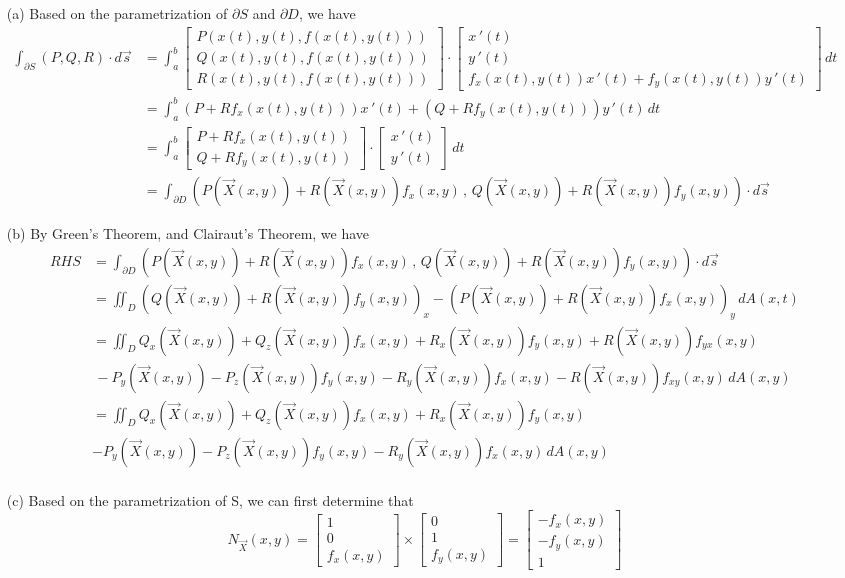 \documentclass[11pt,letterpaper,cm]{nupset}
\newcommand{\bmat}[1]{\begin{bmatrix} #1 \end{bmatrix}}
\begin{document}
\begin{solution}
		\begin{itemize}
		\item[(a)] Based on the parametrization of $\partial S$ and $\partial D$, we have
			\begin{align*}
				\int_{\partial S} (P,Q,R) \cdot d\vec{s}&=\int_a^b \bmat{P(x(t),y(t),f(x(t),y(t)))\\Q(x(t),y(t),f(x(t),y(t)))\\R(x(t),y(t),f(x(t),y(t)))}\cdot\bmat{x\, '(t)\\y\, '(t)\\f_x(x(t),y(t))x\, '(t)+f_y(x(t),y(t))y\, '(t)}\,dt\\
				&=\int_a^b (P+Rf_x(x(t),y(t)))x\,'(t)+(Q+Rf_y(x(t),y(t)))y\,'(t)\,dt\\
				&=\int_a^b \bmat{P+Rf_x(x(t),y(t))\\Q+Rf_y(x(t),y(t))}\cdot\bmat{x\,'(t)\\y\,'(t)}\,dt\\
				&=\int_{\partial D} (P(\vec{X}(x,y))+R(\vec{X}(x,y))f_x(x,y)\,,\, Q(\vec{X}(x,y))+R(\vec{X}(x,y))f_y(x,y))\cdot d\vec{s}
			\end{align*}
		\item[(b)] By Green's Theorem, and Clairaut's Theorem, we have
			\begin{align*}
				RHS &= \int_{\partial D} (P(\vec{X}(x,y))+R(\vec{X}(x,y))f_x(x,y)\,,\, Q(\vec{X}(x,y))+R(\vec{X}(x,y))f_y(x,y))\cdot d\vec{s}\\
				&= \iint_D (Q(\vec{X}(x,y))+R(\vec{X}(x,y))f_y(x,y))_x-(P(\vec{X}(x,y))+R(\vec{X}(x,y))f_x(x,y))_y\, dA(x,t)\\
				&=\iint_D Q_x(\vec{X}(x,y))+Q_z(\vec{X}(x,y))f_x(x,y)+R_x(\vec{X}(x,y))f_y(x,y)+R(\vec{X}(x,y))f_{yx}(x,y)\\
				&\, -P_y(\vec{X}(x,y))-P_z(\vec{X}(x,y))f_y(x,y)-R_y(\vec{X}(x,y))f_x(x,y)-R(\vec{X}(x,y))f_{xy}(x,y)\, dA(x,y)\\
				&=\iint_D Q_x(\vec{X}(x,y))+Q_z(\vec{X}(x,y))f_x(x,y)+R_x(\vec{X}(x,y))f_y(x,y)\\
				&-P_y(\vec{X}(x,y))-P_z(\vec{X}(x,y))f_y(x,y)-R_y(\vec{X}(x,y))f_x(x,y)\, dA(x,y)\\
			\end{align*}
		\item[(c)] Based on the parametrization of S, we can first determine that
		$$N_{\vec{X}}(x,y)=\bmat{1\\0\\f_x(x,y)}\times\bmat{0\\1\\f_y(x,y)}=\bmat{-f_x(x,y)\\-f_y(x,y)\\1}$$

\end{itemize}
\end{solution}
\end{document}
